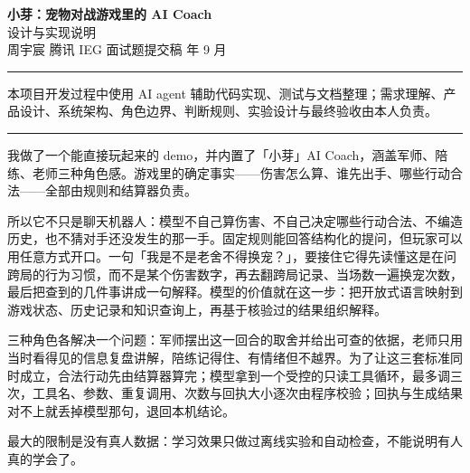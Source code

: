



\begin{center}
{\LARGE\bfseries 小芽：宠物对战游戏里的 AI Coach}\\[0.5em]
{\large 设计与实现说明}\\[0.9em]
{\small 周宇宸 \quad 腾讯 IEG 面试题提交稿  年 9 月}
\end{center}

\begin{center}
\vspace{0.5em}
\begin{center}
\parbox{0.62\linewidth}{\centering
\rule{\linewidth}{0.4pt}\par\vspace{4pt}
{\small 本项目开发过程中使用 AI agent 辅助代码实现、测试与文档整理；需求理解、产品设计、系统架构、角色边界、判断规则、实验设计与最终验收由本人负责。}\par\vspace{-1.2pt}
\rule{\linewidth}{0.4pt}}
\end{center}
\end{center}

\vspace{0.7em}

{\normalsize
我做了一个能直接玩起来的 demo，并内置了「小芽」AI Coach，涵盖军师、陪练、老师三种角色感。游戏里的确定事实——伤害怎么算、谁先出手、哪些行动合法——全部由规则和结算器负责。

所以它不只是聊天机器人：模型不自己算伤害、不自己决定哪些行动合法、不编造历史，也不猜对手还没发生的那一手。固定规则能回答结构化的提问，但玩家可以用任意方式开口。一句「我是不是老舍不得换宠？」，要接住它得先读懂这是在问跨局的行为习惯，而不是某个伤害数字，再去翻跨局记录、当场数一遍换宠次数，最后把查到的几件事讲成一句解释。模型的价值就在这一步：把开放式语言映射到游戏状态、历史记录和知识查询上，再基于核验过的结果组织解释。

三种角色各解决一个问题：军师摆出这一回合的取舍并给出可查的依据，老师只用当时看得见的信息复盘讲解，陪练记得住、有情绪但不越界。为了让这三套标准同时成立，合法行动先由结算器算完；模型拿到一个受控的只读工具循环，最多调三次，工具名、参数、重复调用、次数与回执大小逐次由程序校验；回执与生成结果对不上就丢掉模型那句，退回本机结论。

最大的限制是没有真人数据：学习效果只做过离线实验和自动检查，不能说明有人真的学会了。
}

